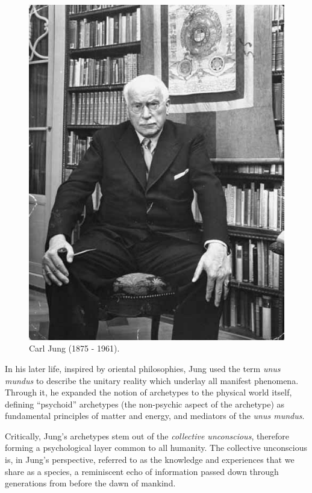 \documentclass[
]{book}
\begin{document}
\begin{figure}

{\centering \includegraphics[width=\textwidth]{img/jung} 

}

\caption{Carl Jung (1875 - 1961).}\label{fig:unnamed-chunk-7}
\end{figure}

In his later life, inspired by oriental philosophies, Jung used the term \emph{unus mundus} to describe the unitary reality which underlay all manifest phenomena. Through it, he expanded the notion of archetypes to the physical world itself, defining ``psychoid'' archetypes (the non-psychic aspect of the archetype) as fundamental principles of matter and energy, and mediators of the \emph{unus mundus}.

Critically, Jung's archetypes stem out of the \emph{collective unconscious}, therefore forming a psychological layer common to all humanity. The collective unconscious is, in Jung's perspective, referred to as the knowledge and experiences that we share as a species, a reminiscent echo of information passed down through generations from before the dawn of mankind.
\end{document}
